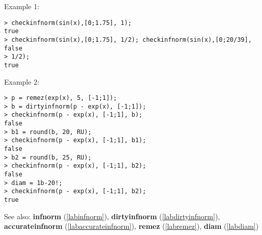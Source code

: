 \noindent Example 1: 
\begin{center}\begin{minipage}{15cm}\begin{Verbatim}[frame=single]
> checkinfnorm(sin(x),[0;1.75], 1);
true
> checkinfnorm(sin(x),[0;1.75], 1/2); checkinfnorm(sin(x),[0;20/39],
false
> 1/2);
true
\end{Verbatim}
\end{minipage}\end{center}
\noindent Example 2: 
\begin{center}\begin{minipage}{15cm}\begin{Verbatim}[frame=single]
> p = remez(exp(x), 5, [-1;1]);
> b = dirtyinfnorm(p - exp(x), [-1;1]);
> checkinfnorm(p - exp(x), [-1;1], b);
false
> b1 = round(b, 20, RU);
> checkinfnorm(p - exp(x), [-1;1], b1);
false
> b2 = round(b, 25, RU);
> checkinfnorm(p - exp(x), [-1;1], b2);
false
> diam = 1b-20!;
> checkinfnorm(p - exp(x), [-1;1], b2);
true
\end{Verbatim}
\end{minipage}\end{center}
See also: \textbf{infnorm} (\ref{labinfnorm}), \textbf{dirtyinfnorm} (\ref{labdirtyinfnorm}), \textbf{accurateinfnorm} (\ref{labaccurateinfnorm}), \textbf{remez} (\ref{labremez}), \textbf{diam} (\ref{labdiam})
